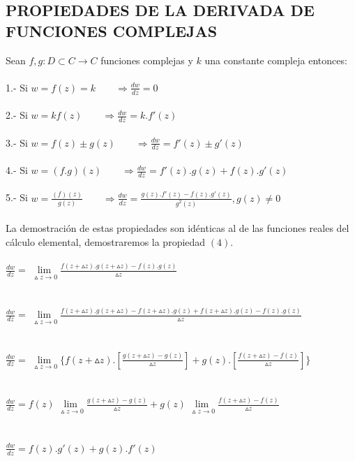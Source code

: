 \documentclass[10pt,a4paper]{book}
\begin{document}
\subsection{PROPIEDADES DE LA DERIVADA DE FUNCIONES COMPLEJAS}
Sean $f,g:D \subset C \rightarrow C$ funciones complejas y $k$ una constante compleja entonces:
\\
\\
1.- Si $w=f(z)=k \qquad \Rightarrow \frac{dw}{dz}=0$
\\
\\
2.- Si $w=k f(z) \qquad \Rightarrow \frac{dw}{dz}=k.f'(z)$
\\
\\
3.- Si $w=f(z)\pm g(z) \qquad \Rightarrow \frac{dw}{dz}=f'(z)\pm g'(z)$
\\
\\
4.- Si $w=(f.g)(z) \qquad \Rightarrow \frac{dw}{dz}=f'(z).g(z)+f(z).g'(z)$
\\
\\
5.- Si $w=\frac{(f)(z)}{g(z)} \qquad \Rightarrow \frac{dw}{dz}=\frac{g(z).f'(z)-f(z).g'(z)}{g^{2}(z)},  g(z)\neq0$
\\
\\
La demostración de estas propiedades son idénticas al de las funciones reales del cálculo elemental, demostraremos la propiedad $(4)$.
\\
\\
$\frac{dw}{dz}= \lim\limits_{\ \vartriangle z \rightarrow 0}\frac{f(z+\vartriangle z).g(z+\vartriangle z)-f(z).g(z)}{\vartriangle z}$
\\
\\
\\
$\frac{dw}{dz}= \lim\limits_{\ \vartriangle z \rightarrow 0}\frac{f(z+\vartriangle z).g(z+\vartriangle z)-f(z+\vartriangle z).g(z)+f(z+\vartriangle z).g(z)-f(z).g(z)}{\vartriangle z}$
\\
\\
\\
$\frac{dw}{dz}= \lim\limits_{\ \vartriangle z \rightarrow 0} \lbrace f(z+\vartriangle z).[\frac{g(z+\vartriangle z)-g(z)}{\vartriangle z}]+g(z).[\frac{f(z+\vartriangle z)-f(z)}{\vartriangle z}]\rbrace$
\\
\\
\\
$\frac{dw}{dz}=f(z) \lim\limits_{\ \vartriangle z \rightarrow 0} \frac{g(z+\vartriangle z)-g(z)}{\vartriangle z} +g(z)\lim\limits_{\ \vartriangle z \rightarrow 0} \frac{f(z+\vartriangle z)-f(z)}{\vartriangle z}$
\\
\\
\\
$\frac{dw}{dz}=f(z).g'(z)+g(z).f'(z)$
\end{document}

